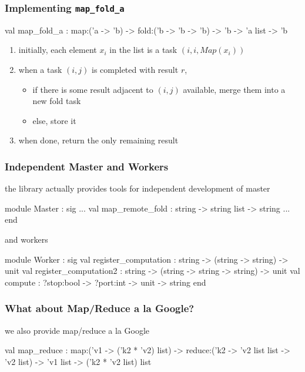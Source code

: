 \documentclass{beamer}
\begin{document}
\begin{frame}\frametitle{Implementing \texttt{map\_fold\_a}}
  \begin{ocaml}
val map_fold_a :
  map:('a -> 'b) -> fold:('b -> 'b -> 'b) -> 
  'b -> 'a list -> 'b
  \end{ocaml}


  \begin{enumerate}
  \item initially, each element $x_i$ in the list is a task $(i,i,Map(x_i))$
  \item when a task $(i,j)$ is completed with result $r$,
    \begin{itemize}
    \item if there is some result adjacent to $(i,j)$ available,
      merge them into a new fold task
    \item else, store it
    \end{itemize}
  \item when done, return the only remaining result
  \end{enumerate}
\end{frame}


\begin{frame}\frametitle{Independent Master and Workers}
  the library actually provides tools for independent development of
  master \small

  \begin{ocaml}
module Master : sig
  ...
  val map_remote_fold : string -> string list -> string
  ...
end
  \end{ocaml}

and workers\small

  \begin{ocaml}
module Worker : sig
  val register_computation : 
    string -> (string -> string) -> unit
  val register_computation2 : 
    string -> (string -> string -> string) -> unit
  val compute : 
    ?stop:bool -> ?port:int -> unit -> string
end
  \end{ocaml}
\end{frame}

\begin{frame}\frametitle{What about Map/Reduce a la Google?}
  we also provide map/reduce a la Google

  \begin{ocaml}
  val map_reduce :
    map:('v1 -> ('k2 * 'v2) list) ->
    reduce:('k2 -> 'v2 list list -> 'v2 list) ->
    'v1 list -> ('k2 * 'v2 list) list
  \end{ocaml}
\end{frame}
\end{document}
